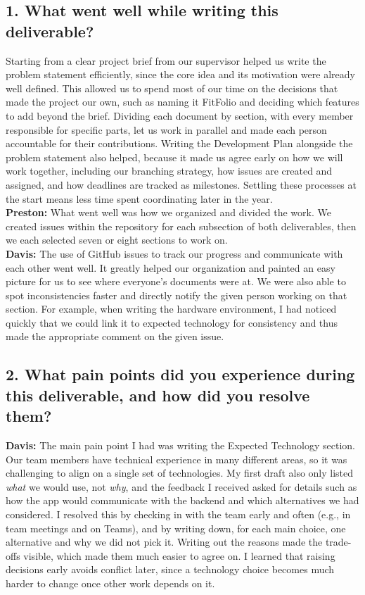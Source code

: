 \documentclass{article}
\begin{document}


\subsection*{1. What went well while writing this deliverable?}
Starting from a clear project brief from our supervisor helped us write the problem statement efficiently, since the core idea and its motivation were already well defined. This allowed us to spend most of our time on the decisions that made the project our own, such as naming it FitFolio and deciding which features to add beyond the brief. Dividing each document by section, with every member responsible for specific parts, let us work in parallel and made each person accountable for their contributions. Writing the Development Plan alongside the problem statement also helped, because it made us agree early on how we will work together, including our branching strategy, how issues are created and assigned, and how deadlines are tracked as milestones. Settling these processes at the start means less time spent coordinating later in the year.
\newline \\
\textbf{Preston:} What went well was how we organized and divided the work. We created issues within the repository for each subsection of both deliverables, then we each selected seven or eight sections to work on.
\newline \\
\textbf{Davis:} The use of GitHub issues to track our progress and communicate with each other went well. It greatly helped our organization and painted an easy picture for us to see where everyone's documents were at. We were also able to spot inconsistencies faster and directly notify the given person working on that section. For example, when writing the hardware environment, I had noticed quickly that we could link it to expected technology for consistency and thus made the appropriate comment on the given issue.

\subsection*{2. What pain points did you experience during this deliverable, and how did you resolve them?}

\textbf{Davis:} The main pain point I had was writing the Expected Technology section. Our team members have technical experience in many different areas, so it was challenging to align on a single set of technologies. My first draft also only listed \emph{what} we would use, not \emph{why}, and the feedback I received asked for details such as how the app would communicate with the backend and which alternatives we had considered. I resolved this by checking in with the team early and often (e.g., in team meetings and on Teams), and by writing down, for each main choice, one alternative and why we did not pick it. Writing out the reasons made the trade-offs visible, which made them much easier to agree on. I learned that raising decisions early avoids conflict later, since a technology choice becomes much harder to change once other work depends on it.
\end{document}
